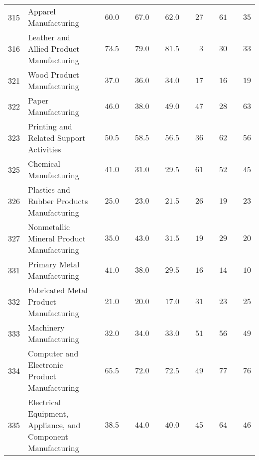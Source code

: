 \documentclass[9pt, oneside]{article}   	%
\begin{document}
\begin{longtable}{lp{3in}cccccc}
315  & Apparel Manufacturing & $\phantom{00}60.0$ & $\phantom{00}67.0$ & $\phantom{00}62.0$ & $\phantom{00}27$ & $\phantom{00}61$ & $\phantom{00}35$ \\
316  & Leather and Allied Product Manufacturing & $\phantom{00}73.5$ & $\phantom{00}79.0$ & $\phantom{00}81.5$ & $\phantom{000}3$ & $\phantom{00}30$ & $\phantom{00}33$ \\
321  & Wood Product Manufacturing & $\phantom{00}37.0$ & $\phantom{00}36.0$ & $\phantom{00}34.0$ & $\phantom{00}17$ & $\phantom{00}16$ & $\phantom{00}19$ \\
322  & Paper Manufacturing & $\phantom{00}46.0$ & $\phantom{00}38.0$ & $\phantom{00}49.0$ & $\phantom{00}47$ & $\phantom{00}28$ & $\phantom{00}63$ \\
323  & Printing and Related Support Activities & $\phantom{00}50.5$ & $\phantom{00}58.5$ & $\phantom{00}56.5$ & $\phantom{00}36$ & $\phantom{00}62$ & $\phantom{00}56$ \\
325  & Chemical Manufacturing & $\phantom{00}41.0$ & $\phantom{00}31.0$ & $\phantom{00}29.5$ & $\phantom{00}61$ & $\phantom{00}52$ & $\phantom{00}45$ \\
326  & Plastics and Rubber Products Manufacturing & $\phantom{00}25.0$ & $\phantom{00}23.0$ & $\phantom{00}21.5$ & $\phantom{00}26$ & $\phantom{00}19$ & $\phantom{00}23$ \\
327  & Nonmetallic Mineral Product Manufacturing & $\phantom{00}35.0$ & $\phantom{00}43.0$ & $\phantom{00}31.5$ & $\phantom{00}19$ & $\phantom{00}29$ & $\phantom{00}20$ \\
331  & Primary Metal Manufacturing & $\phantom{00}41.0$ & $\phantom{00}38.0$ & $\phantom{00}29.5$ & $\phantom{00}16$ & $\phantom{00}14$ & $\phantom{00}10$ \\
332  & Fabricated Metal Product Manufacturing & $\phantom{00}21.0$ & $\phantom{00}20.0$ & $\phantom{00}17.0$ & $\phantom{00}31$ & $\phantom{00}23$ & $\phantom{00}25$ \\
333  & Machinery Manufacturing & $\phantom{00}32.0$ & $\phantom{00}34.0$ & $\phantom{00}33.0$ & $\phantom{00}51$ & $\phantom{00}56$ & $\phantom{00}49$ \\
334  & Computer and Electronic Product Manufacturing & $\phantom{00}65.5$ & $\phantom{00}72.0$ & $\phantom{00}72.5$ & $\phantom{00}49$ & $\phantom{00}77$ & $\phantom{00}76$ \\
335  & Electrical Equipment, Appliance, and Component Manufacturing & $\phantom{00}38.5$ & $\phantom{00}44.0$ & $\phantom{00}40.0$ & $\phantom{00}45$ & $\phantom{00}64$ & $\phantom{00}46$ \\

\end{longtable}
\end{document}
